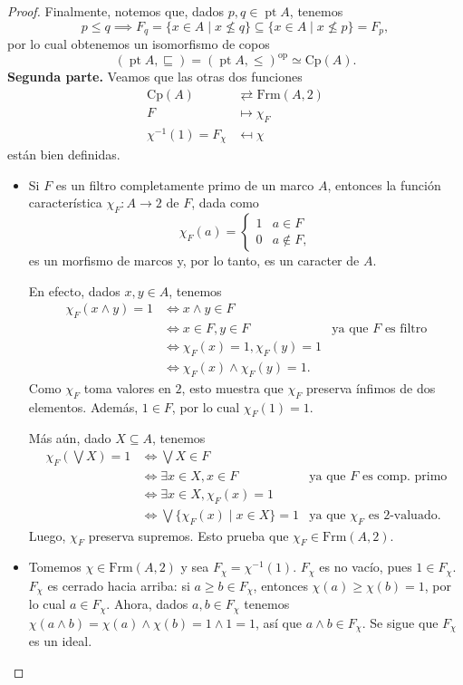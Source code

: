 \documentclass[12pt,letterpaper,titlepage]{article}
\theoremstyle{definition}
\newcommand\Sup{\bigvee}
\renewcommand\inf{\wedge}
\newcommand\<{\langle}
\renewcommand\>{\rangle}
\newcommand{\Frm}{\mathrm{Frm}}
\newcommand{\Cp}{\mathrm{Cp}}
\newcommand{\op}{\mathrm{op}}
\DeclareMathOperator{\pt}{pt}
\begin{document}
\begin{proof}
    Finalmente, notemos que, dados $p,q\in\pt A$, tenemos
    \[
        p\leq q
        \implies
        F_q=\{x\in A\mid x\nleq q\}
        \subseteq
        \{x\in A\mid x\nleq p\}=F_p,
    \]
    por lo cual obtenemos un isomorfismo de copos
    \[
        (\pt A,\sqsubseteq)=(\pt A,\leq)^\op \simeq \Cp(A)
    .\]
    \textbf{Segunda parte.}
    Veamos que las otras dos funciones
    \begin{align*}
        \Cp(A) &\rightleftarrows \Frm(A,2) \\
        F &\mapsto \chi_F \\
        \chi^{-1}(1) = F_\chi &\mapsfrom \chi
    \end{align*}
    están bien definidas.
    \begin{itemize}
        \item
        Si $F$ es un filtro completamente primo de un marco $A$, entonces
        la función característica $\chi_F:A\to 2$ de $F$, dada como
        \[
            \chi_F(a)=
            \begin{cases}
                1 & a\in F \\
                0 & a\nin F,
            \end{cases}
        \]
        es un morfismo de marcos y, por lo tanto, es un caracter de $A$.
        
        En efecto, dados $x,y\in A$, tenemos
        \begin{align*}
            \chi_F(x\inf y) = 1
            &\iff x\inf y\in F \\
            &\iff x\in F, y\in F & \text{ya que $F$ es filtro} \\
            &\iff \chi_F(x)=1, \chi_F(y)=1 \\
            &\iff \chi_F(x)\inf\chi_F(y)=1.
        \end{align*}
        Como $\chi_F$ toma valores en $2$, esto muestra que
        $\chi_F$ preserva ínfimos de dos elementos.
        Además, $1\in F$, por lo cual $\chi_F(1)=1$.
        
        Más aún, dado $X\subseteq A$, tenemos
        \begin{align*}
            \chi_F(\Sup X) = 1
            &\iff \Sup X\in F \\
            &\iff \exists x\in X, x\in F
                & \text{ya que $F$ es comp. primo} \\
            &\iff \exists x\in X, \chi_F(x) = 1 \\
            &\iff \Sup\{\chi_F(x)\mid x\in X\} = 1
                & \text{ya que $\chi_F$ es $2$-valuado.}
        \end{align*}
        Luego, $\chi_F$ preserva supremos.
        Esto prueba que $\chi_F\in\Frm(A,2)$.
        \item
        Tomemos $\chi\in\Frm(A,2)$ y sea $F_\chi=\chi^{-1}(1)$.
        $F_\chi$ es no vacío, pues $1\in F_\chi$.
        $F_\chi$ es cerrado hacia arriba: si $a\geq b\in F_\chi$,
        entonces $\chi(a)\geq\chi(b)=1$, por lo cual $a\in F_\chi$.
        Ahora, dados $a,b\in F_\chi$ tenemos
        $\chi(a\inf b)=\chi(a)\inf\chi(b)=1\inf 1=1$, así que
        $a\inf b\in F_\chi$.
        Se sigue que $F_\chi$ es un ideal.
        

\end{itemize}
\end{proof}
\end{document}
